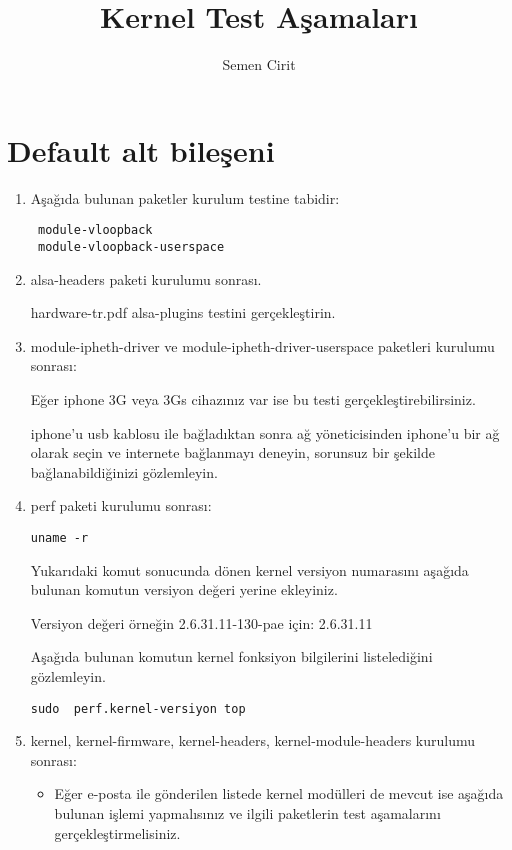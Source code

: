 \documentclass[a4paper,10pt]{article}
\title{Kernel Test Aşamaları}
\author{Semen Cirit}
\begin{document}
\maketitle

\section{Default alt bileşeni}

\begin{enumerate}
\item Aşağıda bulunan paketler kurulum testine tabidir:
\begin{verbatim}
 module-vloopback
 module-vloopback-userspace
\end{verbatim}

\item alsa-headers paketi kurulumu sonrası.

hardware-tr.pdf alsa-plugins testini gerçekleştirin.

\item module-ipheth-driver ve module-ipheth-driver-userspace paketleri kurulumu sonrası:

Eğer iphone 3G veya 3Gs cihazınız var ise bu testi gerçekleştirebilirsiniz.

iphone'u usb kablosu ile bağladıktan sonra ağ yöneticisinden iphone'u bir ağ olarak seçin ve internete bağlanmayı deneyin, sorunsuz bir şekilde bağlanabildiğinizi gözlemleyin.

\item perf paketi kurulumu sonrası:
\begin{verbatim}
uname -r  
\end{verbatim}

Yukarıdaki komut sonucunda dönen kernel versiyon numarasını aşağıda bulunan komutun versiyon değeri yerine ekleyiniz.

Versiyon değeri örneğin 2.6.31.11-130-pae için:  2.6.31.11

Aşağıda bulunan komutun kernel fonksiyon bilgilerini listelediğini gözlemleyin.
\begin{verbatim}
sudo  perf.kernel-versiyon top 
\end{verbatim} 


\item kernel, kernel-firmware, kernel-headers, kernel-module-headers kurulumu sonrası:

\begin{itemize}
\item Eğer e-posta ile gönderilen listede kernel modülleri de mevcut ise aşağıda bulunan işlemi yapmalısınız ve ilgili paketlerin test aşamalarını gerçekleştirmelisiniz.


\end{itemize}
\end{enumerate}
\end{document}
